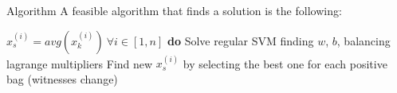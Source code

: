 \begin{frame}{Algorithm}
	A feasible algorithm that finds a solution is the following:
	
	\begin{codebox}
		\li $x_s^{(i)} = avg(x_k^{(i)}) \ \forall i \in [1, n]$
		\li \textbf{do} \Do
		\li Solve regular SVM finding $w$, $b$, balancing lagrange multipliers
		\li Find new $x_s^{(i)}$ by selecting the best one for each positive bag \End
		\li \While(witnesses change)
		
	\end{codebox}
	
\end{frame}

